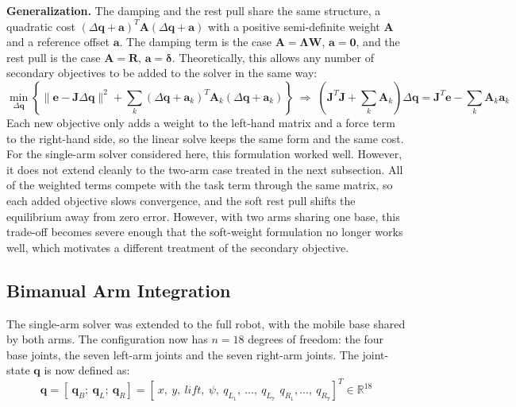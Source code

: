 \documentclass[12pt,a4paper]{article}
\begin{document}
\medskip
\noindent\textbf{Generalization.}
The damping and the rest pull share the same structure, a quadratic cost
$(\Delta\mathbf{q}+\mathbf{a})^{T}\mathbf{A}(\Delta\mathbf{q}+\mathbf{a})$
with a positive semi-definite weight $\mathbf{A}$ and a reference offset
$\mathbf{a}$. The damping term is the case $\mathbf{A}=\boldsymbol{\Lambda}\mathbf{W}$,
$\mathbf{a}=\mathbf{0}$, and the rest pull is the case $\mathbf{A}=\mathbf{R}$,
$\mathbf{a}=\boldsymbol{\delta}$. Theoretically, this allows any number of
secondary objectives to be added to the solver in the same way:
\begin{equation}
    \min_{\Delta\mathbf{q}}
    \left\{
        \|\mathbf{e}-\mathbf{J}\Delta\mathbf{q}\|^2
        + \sum_{k}
        \left(\Delta\mathbf{q}+\mathbf{a}_k\right)^{T}\mathbf{A}_k
        \left(\Delta\mathbf{q}+\mathbf{a}_k\right)
    \right\}
    \;\Rightarrow\;
    \left(\mathbf{J}^{T}\mathbf{J}+\sum_{k}\mathbf{A}_k\right)\Delta\mathbf{q}
    = \mathbf{J}^{T}\mathbf{e}-\sum_{k}\mathbf{A}_k\mathbf{a}_k
    \label{eq:general_objective}
\end{equation}
Each new objective only adds a weight to the left-hand matrix and a force
term to the right-hand side, so the linear solve keeps the same form and
the same cost. For the single-arm solver considered here, this
formulation worked well. However, it does not extend cleanly to the
two-arm case treated in the next subsection. All of the weighted terms
compete with the task term through the same matrix, so each added
objective slows convergence, and the soft rest pull shifts the
equilibrium away from zero error. However, with two arms sharing one base, this trade-off becomes severe enough that the soft-weight formulation no
longer works well, which motivates a different treatment of the
secondary objective.


\newpage

\subsection*{Bimanual Arm Integration}
The single-arm solver was extended to the full robot, with the mobile base
shared by both arms. The configuration now has $n=18$ degrees of freedom: the
four base joints, the seven left-arm joints and the seven right-arm joints. The joint-state $\mathbf{q}$ is now defined as:
\begin{equation}
    \mathbf{q} = [\ \mathbf{q}_B;\ \mathbf{q}_L;\ \mathbf{q}_R]= [\ x,\ y,\ lift,\ \psi, \ q_{L_1},\ ...,\ q_{L_7}\,\ q_{R_1}, ...,\ q_{R_7}]^T \in\mathbb{R}^{18}
\end{equation}
\end{document}
